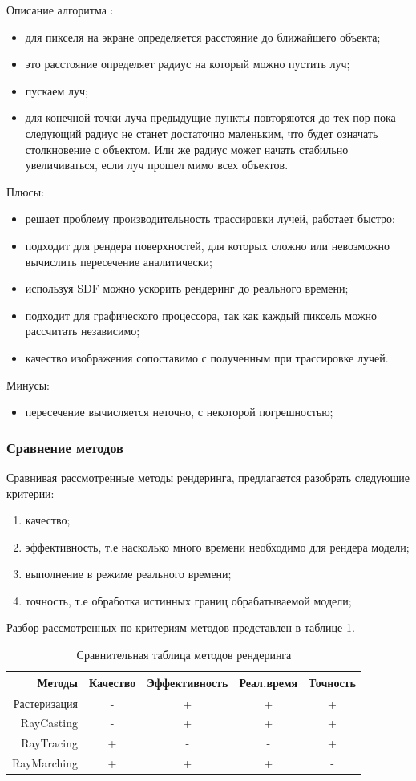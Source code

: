 Описание алгоритма \cite{article:who_to_work_3d}: 
\begin{itemize}
  \item для пикселя на экране определяется расстояние до ближайшего объекта;
  \item это расстояние определяет радиус на который можно пустить луч;
  \item пускаем луч;
  \item для конечной точки луча предыдущие пункты повторяются до тех пор пока следующий радиус не станет достаточно маленьким, 
  что будет означать столкновение с объектом. Или же радиус может начать стабильно увеличиваться, если луч прошел мимо всех объектов.
\end{itemize}
Плюсы:
\begin{itemize}
  \item решает проблему производительность трассировки лучей, работает быстро;
  \item подходит для рендера поверхностей, для которых сложно или невозможно вычислить пересечение аналитически;
  \item используя SDF можно ускорить рендеринг до реального времени;
  \item подходит для графического процессора, так как каждый пиксель можно рассчитать независимо;
  \item качество изображения сопоставимо с полученным при трассировке лучей.
\end{itemize}
Минусы:
\begin{itemize}
  \item пересечение вычисляется неточно, с некоторой погрешностью;
\end{itemize}
\clearpage
\subsubsection{Сравнение методов}
Сравнивая рассмотренные методы рендеринга, предлагается разобрать следующие критерии:
\begin{enumerate}
  \item качество;
  \item эффективность, т.е насколько много времени необходимо для рендера модели;
  \item выполнение в режиме реального времени;
  \item точность, т.е обработка истинных границ обрабатываемой модели;
\end{enumerate}
Разбор рассмотренных по критериям методов представлен в таблице \ref{tab:render}.
\begin{table}[ht]
  \caption{Сравнительная таблица методов рендеринга}
  \begin{tabular}{|r|c|c|c|c|}
  \hline
  Методы & Качество & Эффективность & Реал.время & Точность\\
  \hline
  Растеризация & - & + & + & + \\
  RayCasting & - & + & + & +\\
  RayTracing & + & - & - & +\\
  RayMarching & + & + & + & -\\
  \hline
  \end{tabular}
  \label{tab:render}
\end{table}

